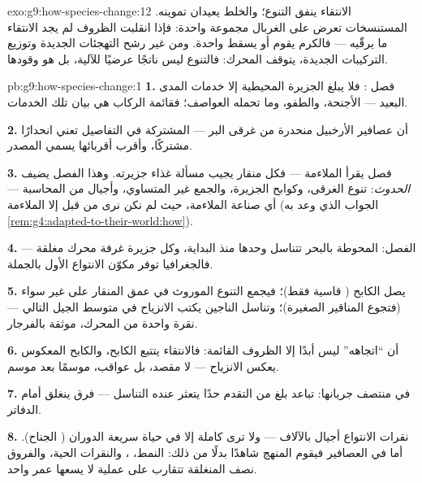 \begin{solution}{exo:g9:how-species-change:12}
الانتقاء ينفق التنوع؛ والخلط  يعيدان تموينه.
 المستنسخات تعرض على الغربال مجموعة واحدة: فإذا
انقلبت الظروف لم يجد الانتقاء ما يرقّيه --- فالكرم يقوم
أو يسقط  واحدة. ومن غير رشح التهجئات الجديدة وتوزيع
التركيبات الجديدة، يتوقف المحرك: فالتنوع ليس ناتجًا
عرضيًا للآلية، بل هو وقودها.
\end{solution}

\begin{solution}{pb:g9:how-species-change:1}
\textbf{1.} فصل : فلا يبلغ الجزيرة المحيطية إلا
خدمات المدى البعيد --- الأجنحة، والطفو، وما تحمله
العواصف؛ فقائمة الركاب هي بيان تلك الخدمات.

\textbf{2.} أن عصافير الأرخبيل منحدرة من غرقى البر ---
 المشتركة في التفاصيل تعني انحدارًا مشتركًا،
وأقرب أقربائها يسمي  المصدر.

\textbf{3.} فصل  يقرأ الملاءمة --- فكل منقار يجيب
مسألة غذاء جزيرته. وهذا الفصل يضيف \emph{الحدوث}: تنوع
الغرقى، وكوابح الجزيرة، والجمع غير المتساوي، وأجيال من
المحاسبة --- أي صناعة الملاءمة، حيث لم نكن نرى من قبل
إلا الملاءمة (الجواب الذي وعد به
\cref{rem:g4:adapted-to-their-world:how}).

\textbf{4.} الفصل:  المحوطة بالبحر تتناسل
وحدها منذ البداية، وكل جزيرة غرفة محرك مغلقة ---
فالجغرافيا توفر مكوّن الانتواع الأول بالجملة.

\textbf{5.} يصل الكابح ( قاسية فقط)؛ فيجمع التنوع
الموروث في عمق المنقار على غير سواء (فتجوع المناقير
الصغيرة)؛ وتناسل الناجين يكتب الانزياح في متوسط الجيل
التالي --- نقرة واحدة من المحرك، موثقة بالفرجار.

\textbf{6.} أن ``اتجاهه'' ليس أبدًا إلا الظروف القائمة:
فالانتقاء يتتبع الكابح، والكابح المعكوس يعكس الانزياح
--- لا مقصد، بل عواقب، موسمًا بعد موسم.

\textbf{7.} 
في منتصف جريانها: تباعد بلغ من التقدم حدًا يتعثر عنده
التناسل --- فرق ينغلق أمام  الدفاتر.

\textbf{8.} نقرات الانتواع أجيال بالآلاف --- ولا ترى
كاملة إلا في حياة سريعة الدوران ( الجناح). أما
في العصافير فيقوم المنهج شاهدًا بدلًا من ذلك: النمط،
، والنقرات الحية، والفروق نصف المنغلقة تتقارب
على عملية لا يسعها عمر واحد.


\end{solution}
